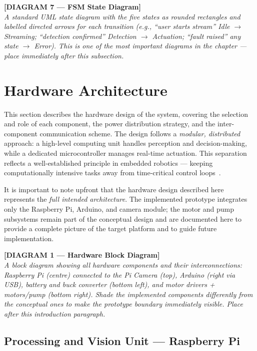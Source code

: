 \bigskip
\noindent\textbf{[DIAGRAM 7 — FSM State Diagram]}\\
\textit{A standard UML state diagram with the five states as rounded
rectangles and labelled directed arrows for each transition (e.g.,
``user starts stream'' Idle $\rightarrow$ Streaming; ``detection
confirmed'' Detection $\rightarrow$ Actuation; ``fault raised'' any
state $\rightarrow$ Error). This is one of the most important diagrams
in the chapter — place immediately after this subsection.}
\bigskip

\section{Hardware Architecture}
\label{sec:hardware}
 
This section describes the hardware design of the system, covering the
selection and role of each component, the power distribution strategy,
and the inter-component communication scheme. The design follows a
\emph{modular, distributed} approach: a high-level computing unit
handles perception and decision-making, while a dedicated
microcontroller manages real-time actuation. This separation reflects
a well-established principle in embedded robotics — keeping
computationally intensive tasks away from time-critical control
loops~\cite{heath2002embedded}.
 
It is important to note upfront that the hardware design described here
represents the \emph{full intended architecture}. The implemented
prototype integrates only the Raspberry Pi, Arduino, and camera module;
the motor and pump subsystems remain part of the conceptual design and
are documented here to provide a complete picture of the target
platform and to guide future implementation.
 
\bigskip
\noindent\textbf{[DIAGRAM 1 — Hardware Block Diagram]}\\
\textit{A block diagram showing all hardware components and their
interconnections: Raspberry Pi (centre) connected to the Pi Camera
(top), Arduino (right via USB), battery and buck converter (bottom
left), and motor drivers + motors/pump (bottom right). Shade the
implemented components differently from the conceptual ones to make
the prototype boundary immediately visible. Place after this
introduction paragraph.}
\bigskip
 
\subsection{Processing and Vision Unit — Raspberry Pi}
 
